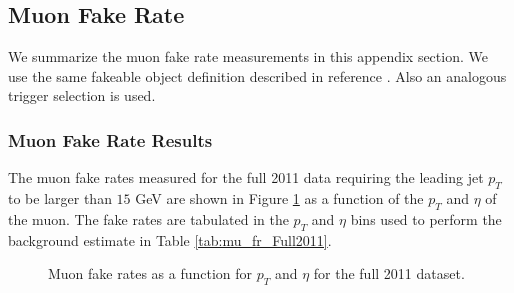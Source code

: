 \subsection{Muon Fake Rate}

We summarize the muon fake rate measurements in this appendix section. We use the same
fakeable object definition described in reference \cite{HWW2011}. Also an analogous trigger
selection is used.

\subsubsection{Muon Fake Rate Results}

The muon fake rates measured for the full 2011 data requiring the leading jet $p_{T}$ to be 
larger than $15$ GeV are shown in Figure \ref{fig:mu_fr_Full2011} as a function of the $p_{T}$ 
and $\eta$ of the muon. The fake rates are tabulated in the 
$p_{T}$ and $\eta$ bins used to perform the background estimate in Table \ref{tab:mu_fr_Full2011}.


\begin{figure}[!htbp]
\begin{center}
\caption{Muon fake rates as a function for $p_{T}$ and $\eta$ for the full 2011 dataset.}
\label{fig:mu_fr_Full2011}
\end{center}
\end{figure}


